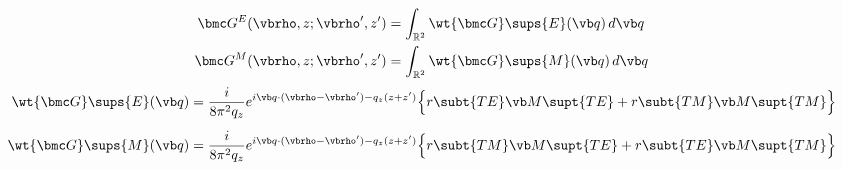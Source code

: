 \documentclass[letterpaper]{article}
\begin{document}
\begin{subequations}
\begin{align}
\bmc G^{E}(\vbrho, z; \vbrho^\prime, z^\prime)
&=\int_{\mathbb{R}^2} \wt{\bmc G}\sups{E}(\vb q) \, d \vb q
\\
\bmc G^{M}(\vbrho, z; \vbrho^\prime, z^\prime)
&=\int_{\mathbb{R}^2} \wt{\bmc G}\sups{M}(\vb q) \, d \vb q
\end{align}
\label{GEGMHalfSpaceIntegrals2D}
\end{subequations}
\begin{subequations}
\begin{align}
\wt{\bmc G}\sups{E}(\vb q)
&=\frac{i}{8\pi^2 q_z}
  e^{i\vb q \cdot (\vbrho-\vbrho^\prime) - q_z(z+z^\prime)}
  \Big\{ r\subt{TE} \vb M\supt{TE} + r\subt{TM} \vb M\supt{TM} \Big\}
\\[5pt]
\wt{\bmc G}\sups{M}(\vb q)
&=\frac{i}{8\pi^2 q_z}
  e^{i\vb q \cdot (\vbrho-\vbrho^\prime) - q_z(z+z^\prime)}
  \Big\{ r\subt{TM} \vb M\supt{TE} + r\subt{TE} \vb M\supt{TM} \Big\}
\end{align}
\label{GEGMHalfSpaceIntegrands2D}
\end{subequations}
\end{document}
